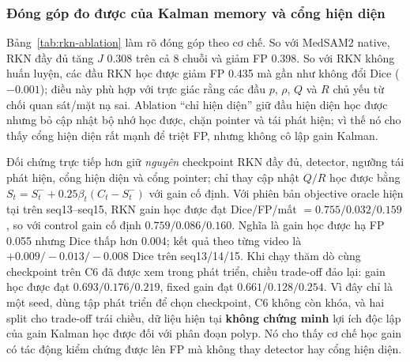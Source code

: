 \documentclass[a4paper,12pt]{report}
\begin{document}
\subsubsection{Đóng góp đo được của Kalman memory và cổng hiện diện}

Bảng~\ref{tab:rkn-ablation} làm rõ đóng góp theo cơ chế. So với MedSAM2 native, RKN đầy đủ tăng $J$ 0.308 trên cả 8 chuỗi và giảm FP 0.398. So với RKN không huấn luyện, các đầu RKN học được giảm FP 0.435 mà gần như không đổi Dice ($-0.001$); điều này phù hợp với trực giác rằng các đầu $p$, $\rho$, $Q$ và $R$ chủ yếu từ chối quan sát/mặt nạ sai. Ablation ``chỉ hiện diện'' giữ đầu hiện diện học được nhưng bỏ cập nhật bộ nhớ học được, chặn pointer và tái phát hiện; vì thế nó cho thấy cổng hiện diện rất mạnh để triệt FP, nhưng không cô lập gain Kalman.

Đối chứng trực tiếp hơn giữ \emph{nguyên} checkpoint RKN đầy đủ, detector, ngưỡng tái phát hiện, cổng hiện diện và cổng pointer; chỉ thay cập nhật $Q/R$ học được bằng $S_t=S_t^-+0.25\beta_t(C_t-S_t^-)$ với gain cố định. Với phiên bản objective oracle hiện tại trên seq13--seq15, RKN gain học được đạt Dice/FP/mất $=0.755/0.032/0.159$, so với control gain cố định $0.759/0.086/0.160$. Nghĩa là gain học được hạ FP 0.055 nhưng Dice thấp hơn 0.004; kết quả theo từng video là $+0.009/-0.013/-0.008$ Dice trên seq13/14/15. Khi chạy thăm dò cùng checkpoint trên C6 đã được xem trong phát triển, chiều trade-off đảo lại: gain học được đạt $0.693/0.176/0.219$, fixed gain đạt $0.661/0.128/0.254$. Vì đây chỉ là một seed, dùng tập phát triển để chọn checkpoint, C6 không còn khóa, và hai split cho trade-off trái chiều, dữ liệu hiện tại \textbf{không chứng minh} lợi ích độc lập của gain Kalman học được đối với phân đoạn polyp. Nó cho thấy cơ chế học gain có tác động kiểm chứng được lên FP mà không thay detector hay cổng hiện diện.

\begin{table}[htbp]
\centering
\caption{Ablation trên C6: tác động của hệ thống RKN (hiệu RKN đầy đủ trừ baseline; trung bình theo chuỗi).}
\label{tab:rkn-ablation}
\end{table}
\end{document}
